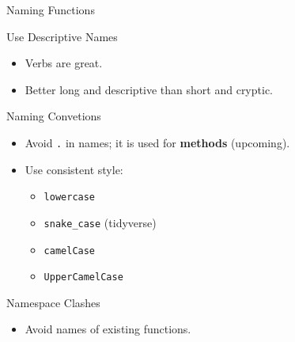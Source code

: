 \documentclass[
  ignorenonframetext,
  aspectratio=1610,
  onlytextwidth]{beamer}
\providecommand{\tightlist}{}
\begin{document}
\begin{frame}[fragile]{Naming Functions}
\label{naming-functions}
\begin{block}{Use Descriptive Names}
\label{use-descriptive-names}
\begin{itemize}[<+->]
\tightlist
\item
  Verbs are great.
\item
  Better long and descriptive than short and cryptic.
\end{itemize}

\pause
\end{block}

\begin{block}{Naming Convetions}
\label{naming-convetions}
\begin{itemize}[<+->]
\tightlist
\item
  Avoid \texttt{.} in names; it is used for \textbf{methods} (upcoming).
\item
  Use consistent style:

  \begin{itemize}[<+->]
  \tightlist
  \item
    \texttt{lowercase}
  \item
    \texttt{snake\_case} (tidyverse)
  \item
    \texttt{camelCase}
  \item
    \texttt{UpperCamelCase}
  \end{itemize}
\end{itemize}

\pause
\end{block}

\begin{block}{Namespace Clashes}
\label{namespace-clashes}
\begin{itemize}[<+->]
\tightlist
\item
  Avoid names of existing functions.
\end{itemize}
\end{block}
\end{frame}
\end{document}
